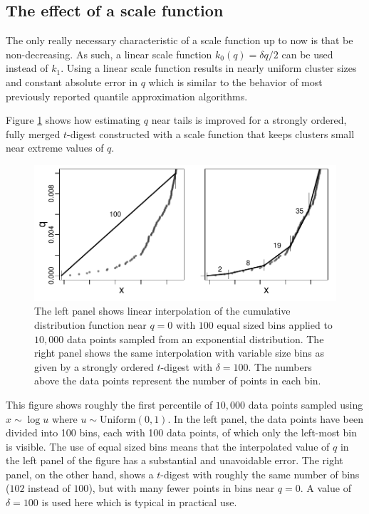 \documentclass[11pt]{amsart}
\begin{document}
\subsection{The effect of a scale function}

The only really necessary characteristic of a scale function up to now is that be non-decreasing. As such,  a linear scale function $k_0(q) = \delta q/2$ can be used instead of  $k_1$. Using a linear scale function results in nearly uniform cluster sizes and constant absolute error in $q$  which is similar to the behavior of most previously reported quantile approximation algorithms. 

Figure \ref{fig:linear-interpolation} shows how  estimating $q$ near tails is improved for a strongly ordered, fully merged $t$-digest constructed with a scale function that keeps clusters small near extreme values of $q$. 
\begin{figure}[h] %
   \centering
   \includegraphics[height=2.in, clip]{linear-interpolation.pdf} 
   \caption{The left panel shows linear interpolation of the cumulative distribution function near $q=0$ with $100$ equal sized bins applied to $10,000$ data points sampled from an exponential distribution. The right panel shows the same interpolation with variable size bins as given by a strongly ordered $t$-digest with $\delta=100$. The numbers above the data points represent the number of points in each bin. }
   \label{fig:linear-interpolation}
\end{figure}
This figure shows roughly the first percentile of $10,000$ data points sampled using $x \sim \log u$ where $u \sim \mathrm{Uniform}(0,1)$. In the left panel, the data points have been divided into 100 bins, each with 100 data points, of which only the left-most bin is visible. The use of equal sized bins means that the interpolated value of $q$ in the left panel of the figure has a substantial and unavoidable error. The right panel, on the other hand, shows a $t$-digest with roughly the same number of bins ($102$ instead of $100$), but with many fewer points in bins near  $q=0$. A value of $\delta= 100$ is used here which is  typical in practical use. 
\end{document}
